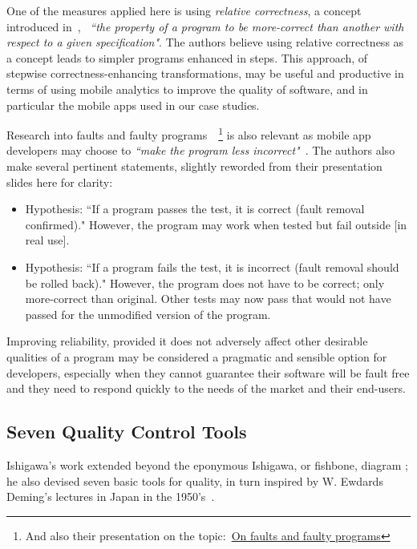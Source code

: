 One of the measures applied here is using \emph{relative correctness}, a concept introduced in~\cite{diallo2015_correctness_and_relative_correctness}, ~\emph{``the
property of a program to be more-correct than another with respect to a given specification"}. The authors believe using relative correctness as a concept leads to simpler programs enhanced  in steps. This approach, of stepwise correctness-enhancing transformations, may be useful and productive in terms of using mobile analytics to improve the quality of software, and in particular the mobile apps used in our case studies. 

Research into faults and faulty programs~\cite{mili2014_on_faults_and_faulty_programs}~\footnote{And also their presentation on the topic:~\href{http://mathcs.chapman.edu/ramics2014/slides/MiliFriasJaouaRAMiCS2014.pdf}{On faults and faulty programs}} is also relevant as mobile app developers may choose to \emph{``make the program less incorrect"}~\cite{mili2014_on_faults_and_faulty_programs}. The authors also make several pertinent statements, slightly reworded from their presentation slides here for clarity:
\begin{itemize}
    \item Hypothesis: ``If a program passes the test, it is correct (fault removal confirmed)." However, the program may work when tested but fail outside [in real use].
    \item Hypothesis: ``If a program fails the test, it is incorrect (fault removal should be rolled back)." However, the program does not have to be correct; only more-correct than original. Other tests may now pass that would not have passed for the unmodified version of the program.
\end{itemize}

Improving reliability, provided it does not adversely affect other desirable qualities of a program may be considered a pragmatic and sensible option for developers, especially when they cannot guarantee their software will be fault free and they need to respond quickly to the needs of the market and their end-users.



\subsection{Seven Quality Control Tools}
Ishigawa's work extended beyond the eponymous Ishigawa, or fishbone, diagram %
; he also devised seven basic tools for quality, in turn inspired by W. Ewdards Deming's lectures in Japan in the 1950's~\cite{7_basic_quality_tools_with_R}.

